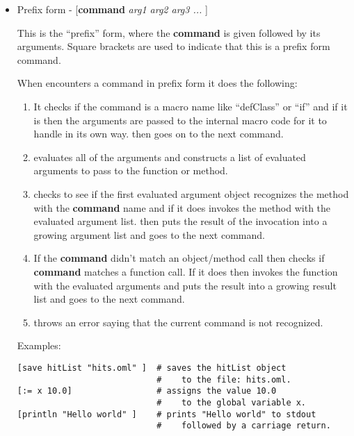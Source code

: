 \begin{itemize}
\item Prefix form - [\textbf{command} \emph{arg1 arg2 arg3 ...} ]

This is the ``prefix'' form, where the \textbf{command} is given followed by its arguments. 
Square brackets are used to indicate that this is a prefix form command.

When {\CANDOSCRIPT} encounters a command in prefix form it does the following:
\begin{enumerate}
\item It checks if the command is a macro name like ``defClass'' or ``if'' and if it is
then the arguments are passed to the internal macro code for it to handle in its own way.
{\CANDOSCRIPT} then goes on to the next command.

\item {\CANDOSCRIPT} evaluates all of the arguments and constructs a list of evaluated arguments to
pass to the function or method.

\item {\CANDOSCRIPT} checks to see if the first evaluated argument object recognizes the method with
the \textbf{command} name and if it does {\CANDOSCRIPT} invokes the method with the evaluated argument list.
{\CANDOSCRIPT} then puts the result of the invocation into a growing argument list and goes to the
next command.

\item If the \textbf{command} didn't match an object/method call then {\CANDOSCRIPT} checks if \textbf{command}
matches a function call.  If it does then {\CANDOSCRIPT} invokes the function with the evaluated arguments and puts the
result into a growing result list and goes to the next command.

\item {\CANDOSCRIPT} throws an error saying that the current command is not recognized.

\end{enumerate}

Examples:\par
\begin{verbatim}
[save hitList "hits.oml" ]  # saves the hitList object 
                            #    to the file: hits.oml.
[:= x 10.0]                 # assigns the value 10.0 
                            #    to the global variable x.
[println "Hello world" ]    # prints "Hello world" to stdout 
                            #    followed by a carriage return.
\end{verbatim}


\end{itemize}
